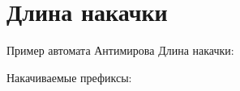 \section{Длина накачки}
\begin{frame}{Пример автомата Антимирова}
    \vspace{-5pt}
	Длина накачки:

    Накачиваемые префиксы:
    
\end{frame}
